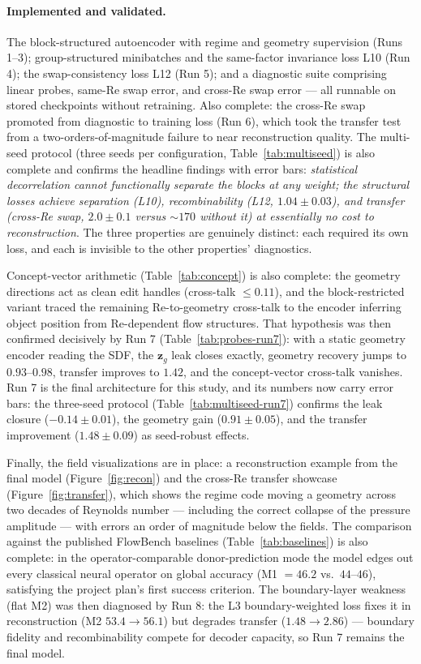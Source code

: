 \documentclass[11pt]{article}
\begin{document}
\paragraph{Implemented and validated.} The block-structured autoencoder
with regime and geometry supervision (Runs 1--3); group-structured
minibatches and the same-factor invariance loss L10 (Run 4); the
swap-consistency loss L12 (Run 5); and a diagnostic suite comprising
linear probes, same-Re swap error, and cross-Re swap error --- all
runnable on stored checkpoints without retraining. Also complete: the
cross-Re swap promoted from diagnostic to training loss (Run 6), which
took the transfer test from a two-orders-of-magnitude failure to near
reconstruction quality. The multi-seed protocol (three seeds per
configuration, Table~\ref{tab:multiseed}) is also complete and confirms
the headline findings with error bars: \emph{statistical decorrelation
cannot functionally separate the blocks at any weight; the structural
losses achieve separation (L10), recombinability (L12, $1.04 \pm 0.03$),
and transfer (cross-Re swap, $2.0 \pm 0.1$ versus $\sim\!170$ without
it) at essentially no cost to reconstruction}. The three properties are
genuinely distinct: each required its own loss, and each is invisible to
the other properties' diagnostics.

Concept-vector arithmetic (Table~\ref{tab:concept}) is also complete:
the geometry directions act as clean edit handles (cross-talk
$\le 0.11$), and the block-restricted variant traced the remaining
Re-to-geometry cross-talk to the encoder inferring object position from
Re-dependent flow structures. That hypothesis was then confirmed
decisively by Run 7 (Table~\ref{tab:probes-run7}): with a static
geometry encoder reading the SDF, the $\boldsymbol{z}_{g}$ leak closes
exactly, geometry recovery jumps to $0.93$--$0.98$, transfer improves to
$1.42$, and the concept-vector cross-talk vanishes. Run 7 is the final
architecture for this study, and its numbers now carry error bars: the
three-seed protocol (Table~\ref{tab:multiseed-run7}) confirms the leak
closure ($-0.14 \pm 0.01$), the geometry gain ($0.91 \pm 0.05$), and the
transfer improvement ($1.48 \pm 0.09$) as seed-robust effects.

Finally, the field visualizations are in place: a reconstruction example
from the final model (Figure~\ref{fig:recon}) and the cross-Re transfer
showcase (Figure~\ref{fig:transfer}), which shows the regime code moving
a geometry across two decades of Reynolds number --- including the
correct collapse of the pressure amplitude --- with errors an order of
magnitude below the fields. The comparison against the published
FlowBench baselines (Table~\ref{tab:baselines}) is also complete: in the
operator-comparable donor-prediction mode the model edges out every
classical neural operator on global accuracy (M1 $= 46.2$ vs.\
$44$--$46$), satisfying the project plan's first success criterion.
The boundary-layer weakness (flat M2) was then diagnosed by Run 8: the
L3 boundary-weighted loss fixes it in reconstruction (M2 $53.4 \to
56.1$) but degrades transfer ($1.48 \to 2.86$) --- boundary fidelity
and recombinability compete for decoder capacity, so Run 7 remains the
final model.
\end{document}

